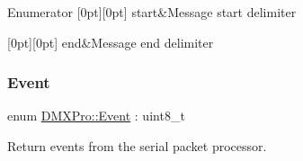 \begin{DoxyEnumFields}{Enumerator}
[0pt][0pt]{}\mbox{\label{namespaceDMXPro_ae978412ae5d98682f1a8f876434749d6ab31985c0a68286d045c874a0d91d300f}} 
start&Message start delimiter \\
\hline

[0pt][0pt]{}\mbox{\label{namespaceDMXPro_ae978412ae5d98682f1a8f876434749d6a0011ec6afa29407d423b9ad17a00c6dd}} 
end&Message end delimiter \\
\hline

\end{DoxyEnumFields}
\mbox{\label{namespaceDMXPro_a0b4335b3ed2abbd803e6d33c54d6ac6d}} 
\subsubsection{\texorpdfstring{Event}{Event}}
{\footnotesize\ttfamily enum \hyperlink{namespaceDMXPro_a0b4335b3ed2abbd803e6d33c54d6ac6d}{D\+M\+X\+Pro\+::\+Event} \+: uint8\+\_\+t}



Return events from the serial packet processor. 


